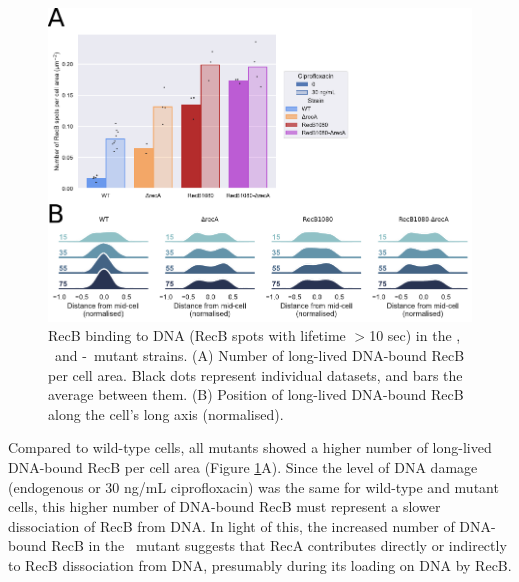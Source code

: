 \begin{figure}[htbp]
    \centering
    \includegraphics[width=\textwidth]{Figures/Fig5_mutants.pdf}
    \caption{RecB binding to DNA (RecB spots with lifetime $>$10 sec) in the \dreca, \teneighty\ and \dreca-\teneighty\ mutant strains. (A) Number of long-lived DNA-bound RecB per cell area. Black dots represent individual datasets, and bars the average between them. (B) Position of long-lived DNA-bound RecB along the cell's long axis (normalised).}
    \label{Fig:mutants}
\end{figure}

Compared to wild-type cells, all mutants showed a higher number of long-lived DNA-bound RecB per cell area (Figure \ref{Fig:mutants}A). Since the level of DNA damage (endogenous or 30 ng/mL ciprofloxacin) was the same for wild-type and mutant cells, this higher number of DNA-bound RecB must represent a slower dissociation of RecB from DNA. In light of this, the increased number of DNA-bound RecB in the \dreca\ mutant suggests that RecA contributes directly or indirectly to RecB dissociation from DNA, presumably during its loading on DNA by RecB.

